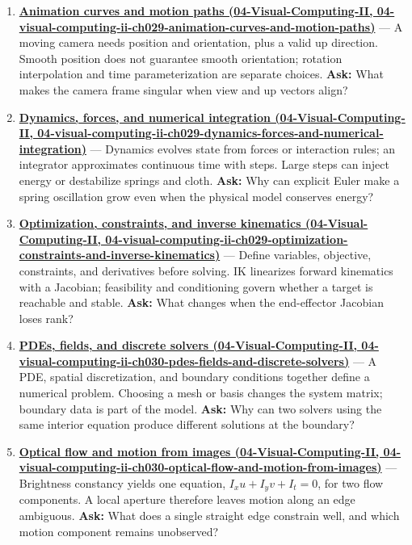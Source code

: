 \begin{enumerate}
\item
  \textbf{\href{../04-Visual-Computing-II/main.pdf\#nameddest=04-visual-computing-ii-ch029-animation-curves-and-motion-paths}{Animation curves and motion paths (04-Visual-Computing-II, 04-visual-computing-ii-ch029-animation-curves-and-motion-paths)}} --- A moving camera needs position and orientation, plus a valid up direction. Smooth position does not guarantee smooth orientation; rotation interpolation and time parameterization are separate choices. \textbf{Ask:} What makes the camera frame singular when view and up vectors align?
\item
  \textbf{\href{../04-Visual-Computing-II/main.pdf\#nameddest=04-visual-computing-ii-ch029-dynamics-forces-and-numerical-integration}{Dynamics, forces, and numerical integration (04-Visual-Computing-II, 04-visual-computing-ii-ch029-dynamics-forces-and-numerical-integration)}} --- Dynamics evolves state from forces or interaction rules; an integrator approximates continuous time with steps. Large steps can inject energy or destabilize springs and cloth. \textbf{Ask:} Why can explicit Euler make a spring oscillation grow even when the physical model conserves energy?
\item
  \textbf{\href{../04-Visual-Computing-II/main.pdf\#nameddest=04-visual-computing-ii-ch029-optimization-constraints-and-inverse-kinematics}{Optimization, constraints, and inverse kinematics (04-Visual-Computing-II, 04-visual-computing-ii-ch029-optimization-constraints-and-inverse-kinematics)}} --- Define variables, objective, constraints, and derivatives before solving. IK linearizes forward kinematics with a Jacobian; feasibility and conditioning govern whether a target is reachable and stable. \textbf{Ask:} What changes when the end-effector Jacobian loses rank?
\item
  \textbf{\href{../04-Visual-Computing-II/main.pdf\#nameddest=04-visual-computing-ii-ch030-pdes-fields-and-discrete-solvers}{PDEs, fields, and discrete solvers (04-Visual-Computing-II, 04-visual-computing-ii-ch030-pdes-fields-and-discrete-solvers)}} --- A PDE, spatial discretization, and boundary conditions together define a numerical problem. Choosing a mesh or basis changes the system matrix; boundary data is part of the model. \textbf{Ask:} Why can two solvers using the same interior equation produce different solutions at the boundary?
\item
  \textbf{\href{../04-Visual-Computing-II/main.pdf\#nameddest=04-visual-computing-ii-ch030-optical-flow-and-motion-from-images}{Optical flow and motion from images (04-Visual-Computing-II, 04-visual-computing-ii-ch030-optical-flow-and-motion-from-images)}} --- Brightness constancy yields one equation, \(I_xu+I_yv+I_t=0\), for two flow components. A local aperture therefore leaves motion along an edge ambiguous. \textbf{Ask:} What does a single straight edge constrain well, and which motion component remains unobserved?

\end{enumerate}
